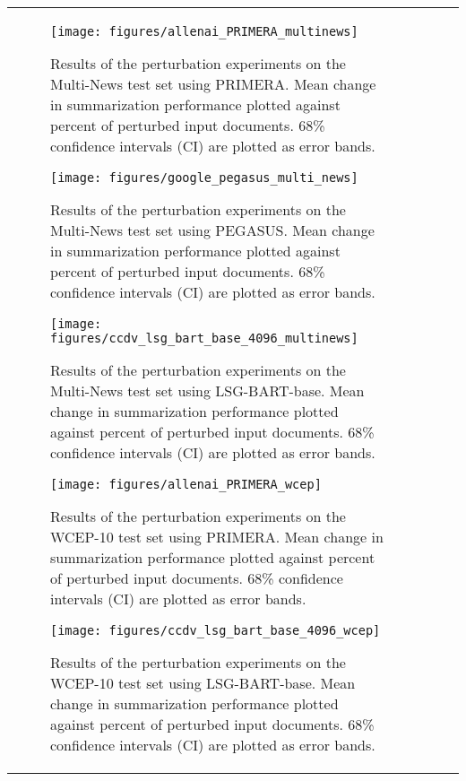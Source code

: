 \documentclass[11pt]{article}
\begin{document}
\begin{table*}[t]
\begin{tabular}{p{} p{} p{}}
{\clearpage

\begin{figure}[t]
\centering
\texttt{[image: figures/allenai\_PRIMERA\_multinews]}
\caption{Results of the perturbation experiments on the Multi-News test set using PRIMERA. Mean change in summarization performance plotted against percent of perturbed input documents. 68\% confidence intervals (CI) are plotted as error bands.}
\label{fig:primera-multinews}
\end{figure}

\begin{figure}[t]
\centering
\texttt{[image: figures/google\_pegasus\_multi\_news]}
\caption{Results of the perturbation experiments on the Multi-News test set using PEGASUS. Mean change in summarization performance plotted against percent of perturbed input documents. 68\% confidence intervals (CI) are plotted as error bands.}
\label{fig:pegasus-multinews}
\end{figure}

\begin{figure}[t]
\centering
\texttt{[image: figures/ccdv\_lsg\_bart\_base\_4096\_multinews]}
\caption{Results of the perturbation experiments on the Multi-News test set using LSG-BART-base. Mean change in summarization performance plotted against percent of perturbed input documents. 68\% confidence intervals (CI) are plotted as error bands.}
\label{fig:lsg-bart-multinews}
\end{figure}

\begin{figure}[t]
\centering
\texttt{[image: figures/allenai\_PRIMERA\_wcep]}
\caption{Results of the perturbation experiments on the WCEP-10 test set using PRIMERA. Mean change in summarization performance plotted against percent of perturbed input documents. 68\% confidence intervals (CI) are plotted as error bands.}
\label{fig:primera-wcep}
\end{figure}

\begin{figure}[t]
\centering
\texttt{[image: figures/ccdv\_lsg\_bart\_base\_4096\_wcep]}
\caption{Results of the perturbation experiments on the WCEP-10 test set using LSG-BART-base. Mean change in summarization performance plotted against percent of perturbed input documents. 68\% confidence intervals (CI) are plotted as error bands.}
\label{fig:lsg-bart-wcep}
\end{figure}

}
\end{tabular}
\end{table*}
\end{document}
